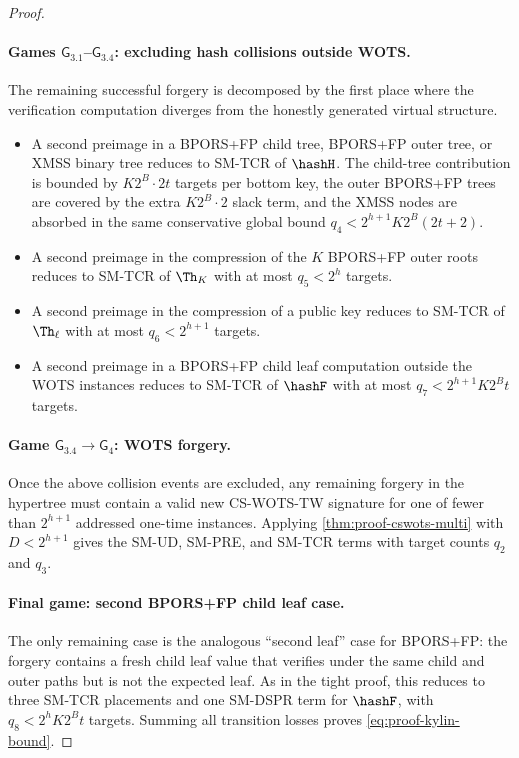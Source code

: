 \begin{proof}
\paragraph{Games $\mathsf{G}_{3.1}$--$\mathsf{G}_{3.4}$: excluding hash
collisions outside WOTS.}
The remaining successful forgery is decomposed by the first place where the
verification computation diverges from the honestly generated virtual
structure.
\begin{itemize}
    \item A second preimage in a BPORS+FP child tree, BPORS+FP outer tree, or
    XMSS binary tree reduces to SM-TCR of $\hashH$.  The child-tree contribution
    is bounded by $K2^B\cdot 2t$ targets per bottom key, the outer BPORS+FP
    trees are covered by the extra $K2^B\cdot 2$ slack term, and the XMSS nodes
    are absorbed in the same conservative global bound
    $q_4<2^{h+1}K2^B(2t+2)$.
    \item A second preimage in the compression of the $K$ BPORS+FP outer roots
    reduces to SM-TCR of $\Th_K$ with at most $q_5<2^h$ targets.
    \item A second preimage in the compression of a \WOTSCS public key reduces
    to SM-TCR of $\Th_\ell$ with at most $q_6<2^{h+1}$ targets.
    \item A second preimage in a BPORS+FP child leaf computation outside the
    WOTS instances reduces to SM-TCR of $\hashF$ with at most
    $q_7<2^{h+1}K2^Bt$ targets.
\end{itemize}

\paragraph{Game $\mathsf{G}_{3.4}\to\mathsf{G}_4$: WOTS forgery.}
Once the above collision events are excluded, any remaining forgery in the
hypertree must contain a valid new CS-WOTS-TW signature for one of fewer than
$2^{h+1}$ addressed one-time instances.  Applying
\cref{thm:proof-cswots-multi} with $D<2^{h+1}$ gives the SM-UD, SM-PRE, and
SM-TCR terms with target counts $q_2$ and $q_3$.

\paragraph{Final game: second BPORS+FP child leaf case.}
The only remaining case is the analogous ``second leaf'' case for BPORS+FP:
the forgery contains a fresh child leaf value that verifies under the same
child and outer paths but is not the expected leaf.  As in the tight
\SPHINCSP proof, this reduces to three SM-TCR placements and one SM-DSPR term
for $\hashF$, with $q_8<2^hK2^Bt$ targets.  Summing all transition losses proves
\cref{eq:proof-kylin-bound}.
\end{proof}

